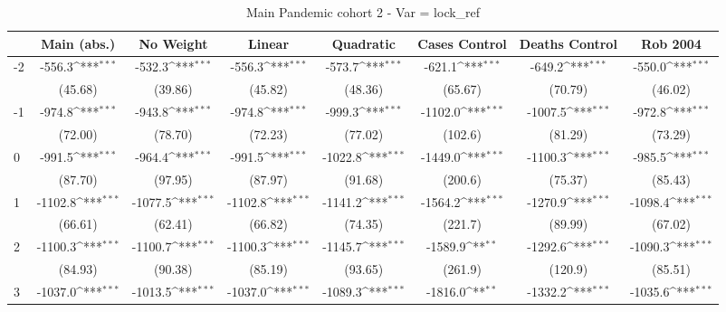 \documentclass{article}
\begin{document}
{
\def\sym#1{\ifmmode^{#1}\else\(^{#1}\)\fi}
\begin{longtable}{l*{7}{c}}
\caption{Main Pandemic cohort 2 - Var = lock\_ref}\\
\hline\hline\endfirsthead\hline\endhead\hline\endfoot\endlastfoot
                &\multicolumn{1}{c}{Main (abs.)}&\multicolumn{1}{c}{No Weight}&\multicolumn{1}{c}{Linear}&\multicolumn{1}{c}{Quadratic}&\multicolumn{1}{c}{Cases Control}&\multicolumn{1}{c}{Deaths Control}&\multicolumn{1}{c}{Rob 2004}\\
\hline
-2              &   -556.3\sym{***}&   -532.3\sym{***}&   -556.3\sym{***}&   -573.7\sym{***}&   -621.1\sym{***}&   -649.2\sym{***}&   -550.0\sym{***}\\
                &  (45.68)         &  (39.86)         &  (45.82)         &  (48.36)         &  (65.67)         &  (70.79)         &  (46.02)         \\
-1              &   -974.8\sym{***}&   -943.8\sym{***}&   -974.8\sym{***}&   -999.3\sym{***}&  -1102.0\sym{***}&  -1007.5\sym{***}&   -972.8\sym{***}\\
                &  (72.00)         &  (78.70)         &  (72.23)         &  (77.02)         &  (102.6)         &  (81.29)         &  (73.29)         \\
0               &   -991.5\sym{***}&   -964.4\sym{***}&   -991.5\sym{***}&  -1022.8\sym{***}&  -1449.0\sym{***}&  -1100.3\sym{***}&   -985.5\sym{***}\\
                &  (87.70)         &  (97.95)         &  (87.97)         &  (91.68)         &  (200.6)         &  (75.37)         &  (85.43)         \\
1               &  -1102.8\sym{***}&  -1077.5\sym{***}&  -1102.8\sym{***}&  -1141.2\sym{***}&  -1564.2\sym{***}&  -1270.9\sym{***}&  -1098.4\sym{***}\\
                &  (66.61)         &  (62.41)         &  (66.82)         &  (74.35)         &  (221.7)         &  (89.99)         &  (67.02)         \\
2               &  -1100.3\sym{***}&  -1100.7\sym{***}&  -1100.3\sym{***}&  -1145.7\sym{***}&  -1589.9\sym{**} &  -1292.6\sym{***}&  -1090.3\sym{***}\\
                &  (84.93)         &  (90.38)         &  (85.19)         &  (93.65)         &  (261.9)         &  (120.9)         &  (85.51)         \\
3               &  -1037.0\sym{***}&  -1013.5\sym{***}&  -1037.0\sym{***}&  -1089.3\sym{***}&  -1816.0\sym{**} &  -1332.2\sym{***}&  -1035.6\sym{***}\\

\end{longtable}}
\end{document}
